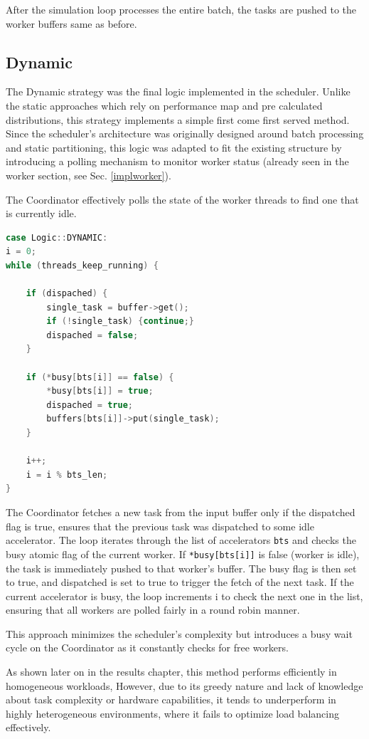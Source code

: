 After the simulation loop processes the entire batch, the tasks are pushed to the worker buffers same as before.

\subsection{Dynamic}
\label{impldynamiclogic}
The Dynamic strategy was the final logic implemented in the scheduler. Unlike the static approaches which rely on performance map and pre calculated distributions, this strategy implements a simple first come first served method. Since the scheduler's architecture was originally designed around batch processing and static partitioning, this logic was adapted to fit the existing structure by introducing a polling mechanism to monitor worker status (already seen in the worker section, see Sec. \ref{implworker}).

The Coordinator effectively polls the state of the worker threads to find one that is currently idle.

\begin{lstlisting}[caption={Static Hetero Logic}, language=C++] 
case Logic::DYNAMIC:  
i = 0;
while (threads_keep_running) { 

    if (dispached) {
        single_task = buffer->get();
        if (!single_task) {continue;} 
        dispached = false;
    }

    if (*busy[bts[i]] == false) {
        *busy[bts[i]] = true; 
        dispached = true;
        buffers[bts[i]]->put(single_task);
    }

    i++;
    i = i % bts_len;
}
\end{lstlisting}

The Coordinator fetches a new task from the input buffer only if the dispatched flag is true, ensures that the previous task was dispatched to some idle accelerator.
The loop iterates through the list of accelerators \texttt{bts} and checks the busy atomic flag of the current worker. If \texttt{*busy[bts[i]]} is false (worker is idle), the task is immediately pushed to that worker's buffer. The busy flag is then set to true, and dispatched is set to true to trigger the fetch of the next task.
If the current accelerator is busy, the loop increments i to check the next one in the list, ensuring that all workers are polled fairly in a round robin manner.

This approach minimizes the scheduler's complexity but introduces a busy wait cycle on the Coordinator as it constantly checks for free workers. 

As shown later on in the results chapter, this method performs efficiently in homogeneous workloads, However, due to its greedy nature and lack of knowledge about task complexity or hardware capabilities, it tends to underperform in highly heterogeneous environments, where it fails to optimize load balancing effectively.





